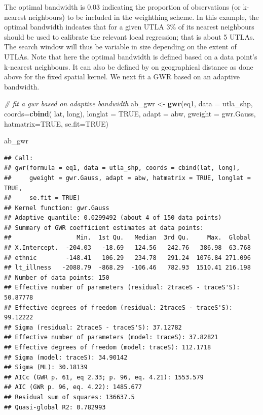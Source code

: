 \documentclass[]{book}
\newenvironment{Shaded}{\begin{snugshade}}{\end{snugshade}}
\newcommand{\KeywordTok}[1]{\textcolor[rgb]{0.13,0.29,0.53}{\textbf{#1}}}
\newcommand{\DataTypeTok}[1]{\textcolor[rgb]{0.13,0.29,0.53}{#1}}
\newcommand{\StringTok}[1]{\textcolor[rgb]{0.31,0.60,0.02}{#1}}
\newcommand{\CommentTok}[1]{\textcolor[rgb]{0.56,0.35,0.01}{\textit{#1}}}
\newcommand{\OtherTok}[1]{\textcolor[rgb]{0.56,0.35,0.01}{#1}}
\newcommand{\NormalTok}[1]{#1}
\begin{document}
The optimal bandwidth is 0.03 indicating the proportion of observations
(or k-nearest neighbours) to be included in the weighthing scheme. In
this example, the optimal bandwidth indcates that for a given UTLA 3\%
of its nearest neighbours should be used to calibrate the relevant local
regression; that is about 5 UTLAs. The search window will thus be
variable in size depending on the extent of UTLAs. Note that here the
optimal bandwidth is defined based on a data point's k-nearest
neighbours. It can also be defined by on geographical distance as done
above for the fixed spatial kernel. We next fit a GWR based on an
adaptive bandwidth.

\begin{Shaded}
\begin{Highlighting}[]
\CommentTok{# fit a gwr based on adaptive bandwidth}
\NormalTok{ab_gwr <-}\StringTok{ }\KeywordTok{gwr}\NormalTok{(eq1, }
            \DataTypeTok{data =}\NormalTok{ utla_shp,}
            \DataTypeTok{coords=}\KeywordTok{cbind}\NormalTok{( lat, long),}
            \DataTypeTok{longlat =} \OtherTok{TRUE}\NormalTok{,}
            \DataTypeTok{adapt =}\NormalTok{ abw, }
            \DataTypeTok{gweight =}\NormalTok{ gwr.Gauss,}
            \DataTypeTok{hatmatrix=}\OtherTok{TRUE}\NormalTok{, }
            \DataTypeTok{se.fit=}\OtherTok{TRUE}\NormalTok{)}

\NormalTok{ab_gwr}
\end{Highlighting}
\end{Shaded}

\begin{verbatim}
## Call:
## gwr(formula = eq1, data = utla_shp, coords = cbind(lat, long), 
##     gweight = gwr.Gauss, adapt = abw, hatmatrix = TRUE, longlat = TRUE, 
##     se.fit = TRUE)
## Kernel function: gwr.Gauss 
## Adaptive quantile: 0.0299492 (about 4 of 150 data points)
## Summary of GWR coefficient estimates at data points:
##                  Min.  1st Qu.   Median  3rd Qu.     Max.  Global
## X.Intercept.  -204.03   -18.69   124.56   242.76   386.98  63.768
## ethnic        -148.41   106.29   234.78   291.24  1076.84 271.096
## lt_illness   -2088.79  -868.29  -106.46   782.93  1510.41 216.198
## Number of data points: 150 
## Effective number of parameters (residual: 2traceS - traceS'S): 50.87778 
## Effective degrees of freedom (residual: 2traceS - traceS'S): 99.12222 
## Sigma (residual: 2traceS - traceS'S): 37.12782 
## Effective number of parameters (model: traceS): 37.82821 
## Effective degrees of freedom (model: traceS): 112.1718 
## Sigma (model: traceS): 34.90142 
## Sigma (ML): 30.18139 
## AICc (GWR p. 61, eq 2.33; p. 96, eq. 4.21): 1553.579 
## AIC (GWR p. 96, eq. 4.22): 1485.677 
## Residual sum of squares: 136637.5 
## Quasi-global R2: 0.782993
\end{verbatim}
\end{document}
